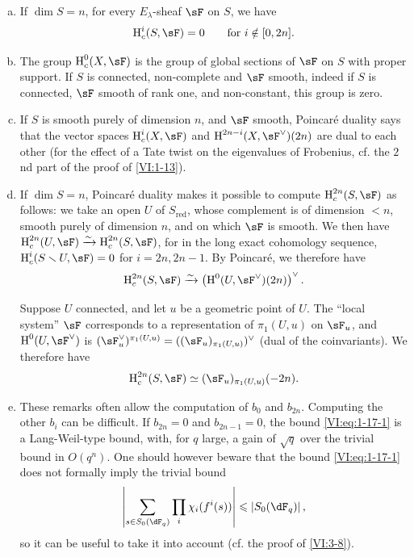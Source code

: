 \begin{enumerate}[a)]
  \item If $\dim S=n$, for every $E_\lambda$-sheaf $\sF$ on $S$, we have 
    \[
      \h_c^i(S,\sF) = 0 \qquad \text{for $i\notin [0,2n]$.}
    \]
  \item The group $\h_c^0(X,\sF)$ is the group of global sections of $\sF$
    on $S$ with proper support. If $S$ is connected, non-complete and
    $\sF$ smooth, indeed if $S$ is connected, $\sF$ smooth of rank one, and
    non-constant, this group is zero.
  \item If $S$ is smooth purely of dimension $n$, and $\sF$ smooth,
    Poincaré duality says that the vector spaces
    $\h_c^i(X,\sF)$ and $\h^{2n-i}(X,\sF^\vee)(2n)$ are dual to each other
    (for the effect of a Tate twist on the eigenvalues of Frobenius,
    cf. the $2$nd part of the proof of \ref{VI:1-13}).
  \item If $\dim S=n$, Poincaré duality makes it possible to compute
    $\h_c^{2n}(S,\sF)$ as follows: we take an open $U$ of $S_\text{red}$, whose
    complement is of dimension $<n$, smooth purely of dimension $n$, and
    on which $\sF$ is smooth. We then have
    $\h_c^{2n}(U,\sF) \iso \h_c^{2n}(S,\sF)$, for in the long exact
    cohomology sequence, $\h_c^i(S\setminus U,\sF) = 0$ for $i=2n,2n-1$. By
    Poincaré, we therefore have 
    \[
      \h_c^{2n}(S,\sF) \iso \left(\h^0(U,\sF^\vee)(2n)\right)^\vee \text{.}
    \]
    
    Suppose $U$ connected, and let $u$ be a geometric point of $U$. The
    ``local system'' $\sF$ corresponds to a representation of
    $\pi_1(U,u)$ on $\sF_u$, and $\h^0(U,\sF^\vee)$ is
    $(\sF_u^\vee)^{\pi_1(U,u)}=((\sF_u)_{\pi_1(U,u)})^\vee$ (dual of the
    coinvariants). We therefore have 
    \[
      \h_c^{2n}(S,\sF) \simeq (\sF_u)_{\pi_1(U,u)}(-2n) \text{.}
    \]
  \item These remarks often allow the computation of $b_0$ and $b_{2n}$.
    Computing the other $b_i$ can be difficult. If $b_{2n}=0$ and
    $b_{2n-1}=0$, the bound \eqref{VI:eq:1-17-1} is a Lang-Weil-type bound,
    with, for $q$ large, a gain of $\sqrt q$ over the
    trivial bound in $O(q^n)$. One should however beware that the
    bound \eqref{VI:eq:1-17-1} does not formally imply the trivial
    bound 
    \[
      \left|\sum_{s\in S_0(\dF_q)} \prod_i \chi_i(f^i(s))\right| \leqslant \left| S_0(\dF_q)\right| \text{,}
    \]
    so it can be useful to take it into account (cf. the proof of \ref{VI:3-8}).
\end{enumerate}

